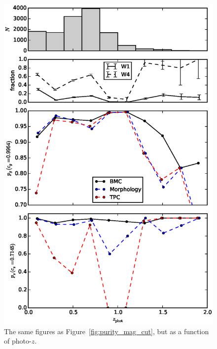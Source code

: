 \documentclass[useAMS,usenatbib]{mn2e}
\begin{document}
\begin{figure}
  \centering
  \includegraphics[width=\linewidth]{figures/purity_z_cut.eps}
  \caption{The same figures as Figure~\ref{fig:purity_mag_cut},
           but as a function of photo-$z$.}
  \label{fig:purity_z_cut}
\end{figure}
\end{document}
